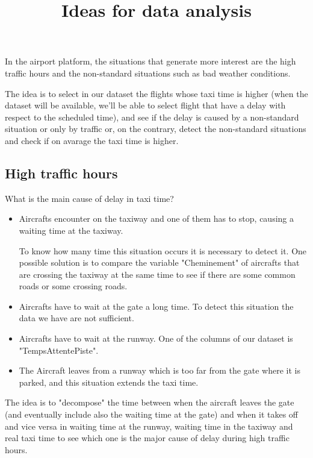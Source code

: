 \documentclass{article}
\begin{document}
	
	\title{Ideas for data analysis}
	\maketitle

In the airport platform, the situations that generate more interest are the high traffic hours and the non-standard situations such as bad weather conditions.

The idea is to select in our dataset the flights whose taxi time is higher (when the dataset will be available, we'll be able to select flight that have a delay with respect to the scheduled time), and see if the delay is caused by a non-standard situation or only by traffic or, on the contrary, detect the non-standard situations and check if on avarage the taxi time is higher.


\subsection{High traffic hours}
What is the main cause of delay in taxi time?
\begin{itemize}
	\item Aircrafts encounter on the taxiway and one of them has to stop, causing a waiting time at the taxiway. 
	
	To know how many time this situation occurs it is necessary to detect it. One possible solution is to compare the variable "Cheminement" of aircrafts that are crossing the taxiway at the same time to see if there are some common roads or some crossing roads. 
	
	\item Aircrafts have to wait at the gate a long time. To detect this situation the data we have are not sufficient.
	
	\item Aircrafts have to wait at the runway. One of the columns of our dataset is "TempsAttentePiste".
	
	\item The Aircraft leaves from a runway which is too far from the gate where it is parked, and this situation extends the taxi time. 
\end{itemize}

The idea is to "decompose" the time between when the aircraft leaves the gate (and eventually include also the waiting time at the gate) and when it takes off and vice versa in waiting time at the runway, waiting time in the taxiway and real taxi time to see which one is the major cause of delay during high traffic hours. 
\end{document}

